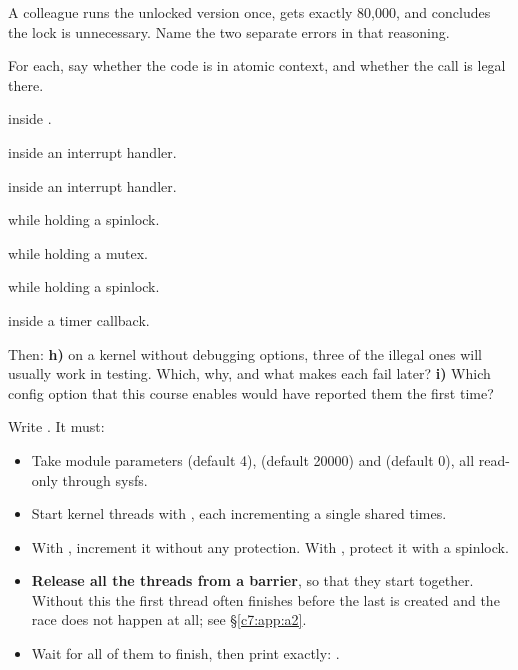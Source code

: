  A colleague runs the unlocked version once, gets exactly 80,000, and concludes the lock is
unnecessary. Name the two separate errors in that reasoning.

\label{c7:ex:5}

For each, say whether the code is in atomic context, and whether the call is legal there.

  inside .

  inside an interrupt handler.

  inside an interrupt handler.

  while holding a spinlock.

  while holding a mutex.

  while holding a spinlock.

  inside a timer callback.

Then: \textbf{h)} on a kernel without debugging options, three of the illegal ones will usually
work in testing. Which, why, and what makes each fail later? \textbf{i)} Which config option that
this course enables would have reported them the first time?

\label{c7:ex:6}

Write . It must:
\begin{itemize}
  \item Take module parameters  (default 4),  (default 20000) and
     (default 0), all read-only through sysfs.
  \item Start  kernel threads with , each incrementing a single
    shared   times.
  \item With , increment it without any protection. With , protect it
    with a spinlock.
  \item \textbf{Release all the threads from a barrier}, so that they start together. Without this
    the first thread often finishes before the last is created and the race does not happen at all;
    see \S\ref{c7:app:a2}.
  \item Wait for all of them to finish, then print exactly: .
\end{itemize}

